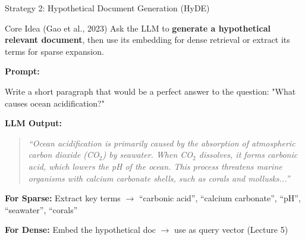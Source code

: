 \documentclass[aspectratio=169]{beamer}
\begin{document}
\begin{frame}[shrink=5]{Strategy 2: Hypothetical Document Generation (HyDE)}
\begin{block}{Core Idea (Gao et al., 2023)}
Ask the LLM to \textbf{generate a hypothetical relevant document}, then use its embedding for dense retrieval or extract its terms for sparse expansion.
\end{block}

\vspace{0.5em}

\textbf{Prompt:}
\begin{tcolorbox}[colback=gray!10, colframe=gray!50, fontupper=\small\ttfamily]
Write a short paragraph that would be a perfect answer to the question: "What causes ocean acidification?"
\end{tcolorbox}

\vspace{0.5em}

\textbf{LLM Output:}
\begin{quote}
\small\itshape
``Ocean acidification is primarily caused by the absorption of atmospheric carbon dioxide (CO$_2$) by seawater. When CO$_2$ dissolves, it forms carbonic acid, which lowers the pH of the ocean. This process threatens marine organisms with calcium carbonate shells, such as corals and mollusks...''
\end{quote}

\vspace{0.5em}

\textbf{For Sparse:} Extract key terms $\to$ ``carbonic acid'', ``calcium carbonate'', ``pH'', ``seawater'', ``corals''

\textbf{For Dense:} Embed the hypothetical doc $\to$ use as query vector (Lecture 5)
\end{frame}
\end{document}
